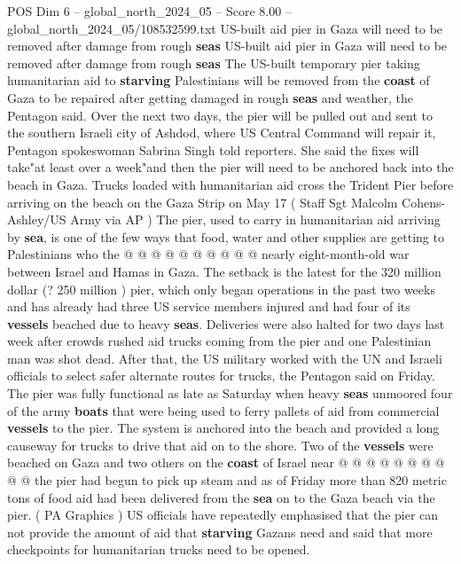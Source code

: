 \begin{textsample}{POS Dim 6 – global\_north\_2024\_05 – Score 8.00 – global\_north\_2024\_05/108532599.txt}  \label{ex:f6_pos_163}
US-built aid pier in Gaza will need to be removed after damage from rough \textbf{seas} US-built aid pier in Gaza will need to be removed after damage from rough \textbf{seas} The US-built temporary pier taking humanitarian aid to \textbf{starving} Palestinians will be removed from the \textbf{coast} of Gaza to be repaired after getting damaged in rough \textbf{seas} and weather, the Pentagon said.
Over the next two days, the pier will be pulled out and sent to the southern Israeli city of Ashdod, where US Central Command will repair it, Pentagon spokeswoman Sabrina Singh told reporters.
She said the fixes will take"at least over a week"and then the pier will need to be anchored back into the beach in Gaza.
Trucks loaded with humanitarian aid cross the Trident Pier before arriving on the beach on the Gaza Strip on May 17 ( Staff Sgt Malcolm Cohens-Ashley/US Army via AP ) The pier, used to carry in humanitarian aid arriving by \textbf{sea}, is one of the few ways that food, water and other supplies are getting to Palestinians who the @ @ @ @ @ @ @ @ @ @ nearly eight-month-old war between Israel and Hamas in Gaza.
The setback is the latest for the 320 million dollar (? 250 million ) pier, which only began operations in the past two weeks and has already had three US service members injured and had four of its \textbf{vessels} beached due to heavy \textbf{seas}.
Deliveries were also halted for two days last week after crowds rushed aid trucks coming from the pier and one Palestinian man was shot dead.
After that, the US military worked with the UN and Israeli officials to select safer alternate routes for trucks, the Pentagon said on Friday.
The pier was fully functional as late as Saturday when heavy \textbf{seas} unmoored four of the army \textbf{boats} that were being used to ferry pallets of aid from commercial \textbf{vessels} to the pier.
The system is anchored into the beach and provided a long causeway for trucks to drive that aid on to the shore.
Two of the \textbf{vessels} were beached on Gaza and two others on the \textbf{coast} of Israel near @ @ @ @ @ @ @ @ @ @ the pier had begun to pick up steam and as of Friday more than 820 metric tons of food aid had been delivered from the \textbf{sea} on to the Gaza beach via the pier. ( PA Graphics ) US officials have repeatedly emphasised that the pier can not provide the amount of aid that \textbf{starving} Gazans need and said that more checkpoints for humanitarian trucks need to be opened.

\end{textsample}
